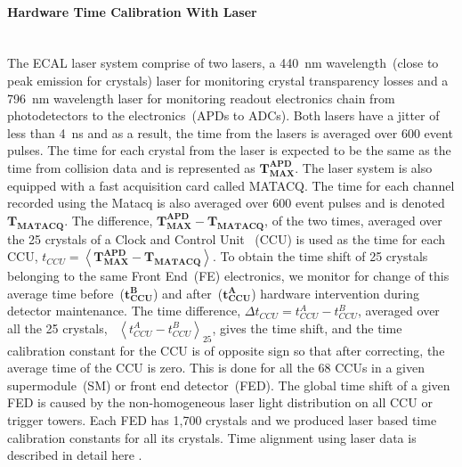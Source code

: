 \paragraph{Hardware Time Calibration With Laser}\mbox{}\\
The ECAL laser system comprise of two lasers, a 440~nm wavelength~(close to peak emission for \pb crystals) laser for monitoring crystal transparency losses and a 796~nm wavelength laser for monitoring readout electronics chain from photodetectors to the electronics~(\ie APDs to ADCs). Both lasers have a jitter of less than 4~ns and as a result, the time from the lasers is averaged over 600 event pulses. The time for each crystal from the laser is expected to be the same as the time from collision data and is represented as $\mathbf{T^{APD}_{MAX}}$. The laser system is also equipped with a fast acquisition card called MATACQ. The time for each channel recorded using the Matacq is also averaged over 600 event pulses and is denoted  $\mathbf{T_{MATACQ}}$.
The difference, $ \mathbf{T^{APD}_{MAX}} - \mathbf{T_{MATACQ}}$, of the two times, averaged over the  25 crystals of a Clock and Control Unit ~(CCU) is used as the time for each CCU, $ t_{CCU} = \left\langle \mathbf{T^{APD}_{MAX} - T_{MATACQ}} \right\rangle $. 
To obtain the time shift of 25 crystals belonging to the same Front End~(FE) electronics, we monitor for change of this average time before~($\mathbf{t^{B}_{CCU}} $) and after~($\mathbf{t^{A}_{CCU}} $) hardware intervention during detector maintenance.  
The time difference, $\Delta t_{CCU} = t^{A}_{CCU} - t^{B}_{CCU}$, averaged over all the 25 crystals, \ie ~$\left\langle t^{A}_{CCU} - t^{B}_{CCU} \right\rangle_{25} $, gives the time shift, and the time calibration constant for the CCU is of opposite sign so that after correcting, the average time of the CCU is zero. This is done for all the 68 CCUs in a given supermodule~(SM) or front end detector~(FED). The global time shift of a given FED is caused by the non-homogeneous laser light distribution on all CCU or trigger towers. Each FED has 1,700 \pb crystals and we produced laser based time calibration constants for all its crystals. Time alignment using laser data is described in detail here \cite{ECALHW}.
